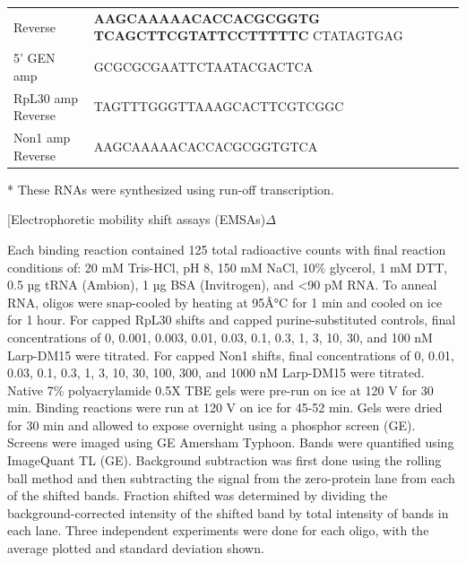 \documentclass[12pt,oneside]{reedthesis}
\begin{document}
\begin{longtable}[]{@{}ll@{}}
\begin{minipage}[t]{0.46\columnwidth}
Reverse\strut
\end{minipage} & \begin{minipage}[t]{0.46\columnwidth}\raggedright
\textbf{AAGCAAAAACACCACGCGGTG}
\textbf{TCAGCTTCGTATTCCTTTTTC}
CTATAGTGAG\strut
\end{minipage}\tabularnewline
\begin{minipage}[t]{0.46\columnwidth}\raggedright
5' GEN amp\strut
\end{minipage} & \begin{minipage}[t]{0.46\columnwidth}\raggedright
GCGCGCGAATTCTAATACGACTCA\strut
\end{minipage}\tabularnewline
\begin{minipage}[t]{0.46\columnwidth}\raggedright
RpL30 amp Reverse\strut
\end{minipage} & \begin{minipage}[t]{0.46\columnwidth}\raggedright
TAGTTTGGGTTAAAGCACTTCGTCGGC\strut
\end{minipage}\tabularnewline
\begin{minipage}[t]{0.46\columnwidth}\raggedright
Non1 amp Reverse\strut
\end{minipage} & \begin{minipage}[t]{0.46\columnwidth}\raggedright
AAGCAAAAACACCACGCGGTGTCA\strut
\end{minipage}\tabularnewline
\bottomrule
\end{longtable}
* These RNAs were synthesized using run-off transcription.

{[}Electrophoretic mobility shift assays (EMSAs)\(\Delta\)

Each binding reaction contained 125 total radioactive counts with final
reaction conditions of: 20 mM Tris-HCl, pH 8, 150 mM NaCl, 10\% glycerol,
1 mM DTT, 0.5 µg tRNA (Ambion), 1 µg BSA (Invitrogen), and \textless90 pM RNA.
To anneal RNA, oligos were snap-cooled by heating at 95Â°C for 1 min and
cooled on ice for 1 hour. For capped RpL30 shifts and capped
purine-substituted controls, final concentrations of 0, 0.001, 0.003,
0.01, 0.03, 0.1, 0.3, 1, 3, 10, 30, and 100 nM Larp-DM15 were titrated.
For capped Non1 shifts, final concentrations of 0, 0.01, 0.03, 0.1, 0.3,
1, 3, 10, 30, 100, 300, and 1000 nM Larp-DM15 were titrated. Native 7\%
polyacrylamide 0.5X TBE gels were pre-run on ice at 120 V for 30 min.
Binding reactions were run at 120 V on ice for 45-52 min. Gels were
dried for 30 min and allowed to expose overnight using a phosphor screen
(GE). Screens were imaged using GE Amersham Typhoon. Bands were
quantified using ImageQuant TL (GE). Background subtraction was first
done using the rolling ball method and then subtracting the signal from
the zero-protein lane from each of the shifted bands. Fraction shifted
was determined by dividing the background-corrected intensity of the
shifted band by total intensity of bands in each lane. Three independent
experiments were done for each oligo, with the average plotted and
standard deviation shown.
\end{document}
